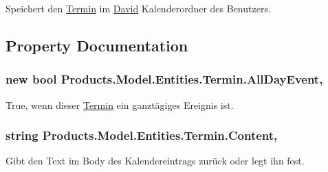Speichert den \hyperlink{class_products_1_1_model_1_1_entities_1_1_termin}{Termin} im \hyperlink{namespace_david}{David} Kalenderordner des Benutzers. 



\subsection{Property Documentation}
\subsubsection[{\texorpdfstring{All\+Day\+Event}{AllDayEvent}}]{\setlength{\rightskip}{0pt plus 5cm}new bool Products.\+Model.\+Entities.\+Termin.\+All\+Day\+Event\hspace{0.3cm}{\ttfamily [get]}, {\ttfamily [set]}}\hypertarget{class_products_1_1_model_1_1_entities_1_1_termin_a429d346c70033f9fd7cfe62361498f84}{}\label{class_products_1_1_model_1_1_entities_1_1_termin_a429d346c70033f9fd7cfe62361498f84}


True, wenn dieser \hyperlink{class_products_1_1_model_1_1_entities_1_1_termin}{Termin} ein ganztägiges Ereignis ist. 

\subsubsection[{\texorpdfstring{Content}{Content}}]{\setlength{\rightskip}{0pt plus 5cm}string Products.\+Model.\+Entities.\+Termin.\+Content\hspace{0.3cm}{\ttfamily [get]}, {\ttfamily [set]}}\hypertarget{class_products_1_1_model_1_1_entities_1_1_termin_a88d530fc21e906fcccf4e75502a49420}{}\label{class_products_1_1_model_1_1_entities_1_1_termin_a88d530fc21e906fcccf4e75502a49420}


Gibt den Text im Body des Kalendereintrags zurück oder legt ihn fest. 

